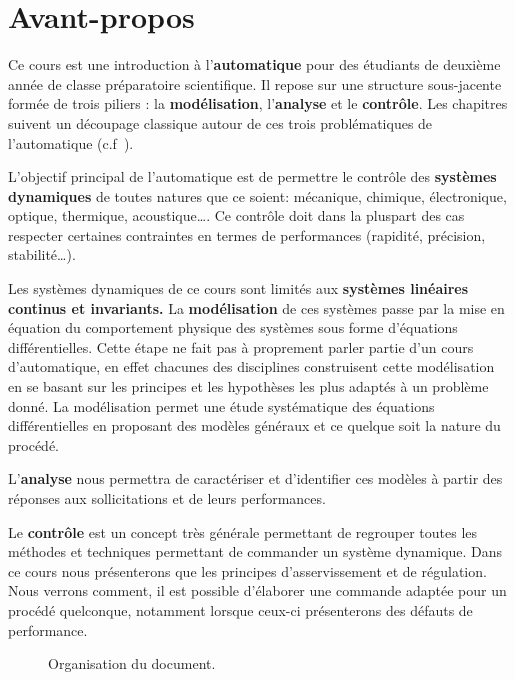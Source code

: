 \chapter*{Avant-propos}

Ce cours est une introduction à l'\textbf{automatique}
pour des étudiants de deuxième année de classe préparatoire scientifique.
Il repose sur une structure sous-jacente formée de 
trois piliers : la \textbf{modélisation}, l'\textbf{analyse} et 
le \textbf{contrôle}. Les chapitres suivent un découpage classique
autour de ces trois problématiques de l'automatique (c.f~).

L'objectif principal de l'automatique est de permettre
le contrôle des \textbf{systèmes dynamiques}
de toutes natures que ce soient: mécanique, chimique, 
électronique, optique, thermique, acoustique\ldots.
Ce contrôle doit dans la pluspart des cas respecter
certaines contraintes en termes de performances (rapidité, précision, stabilité\ldots).

Les systèmes dynamiques de ce cours sont limités 
aux \textbf{systèmes linéaires continus et invariants.}
La \textbf{modélisation} de ces systèmes passe par 
la mise en équation du comportement physique des
systèmes sous forme d'équations différentielles.
Cette étape ne fait pas à proprement parler partie d'un cours d'automatique,
en effet chacunes des disciplines construisent cette modélisation 
en se basant sur les principes et les hypothèses les plus adaptés 
à un problème donné.
La modélisation permet une étude systématique des équations
différentielles en proposant des modèles généraux 
et ce quelque soit la nature du procédé.

L'\textbf{analyse} nous permettra de caractériser et d'identifier 
ces modèles à partir des réponses aux sollicitations et de leurs performances.

Le \textbf{contrôle} est un concept très générale permettant de regrouper
toutes les méthodes et techniques permettant de commander un système dynamique.
Dans ce cours nous présenterons que les principes d'asservissement et de régulation.
Nous verrons comment, il est possible d'élaborer une commande adaptée pour un procédé 
quelconque, notamment lorsque ceux-ci présenterons des défauts de performance.


\begin{figure}[!h]
\renewcommand\thefigure{A}
\begin{center}
{
\tikzset{external/export=false}

}
\end{center}
\caption{Organisation du document.\label{fig-diagramme_cours}}
\end{figure}
